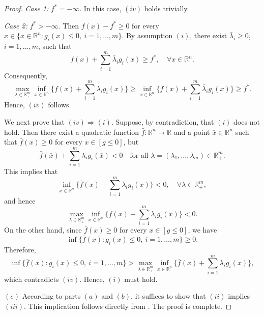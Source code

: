 \documentclass[]{interact}
\theoremstyle{plain}%
\theoremstyle{definition}
\theoremstyle{remark}
\begin{document}
\begin{proof}
		\medskip
		\noindent
		{\it Case 1:} $f^*=-\infty$.  
		In this case, $(iv)$ holds trivially.
		
		\medskip
		\noindent
		{\it Case 2:} $f^*>-\infty$.  
		Then $f(x)-f^*\geq 0$ for every $x\in \{x\in \mathbb{R}^n: g_i(x)\leq 0,\ i=1,\ldots,m\}$. 
		By assumption $(i)$, there exist $\bar\lambda_i\geq 0$, $i=1,\ldots,m$, such that
		\[
		f(x)+\sum_{i=1}^{m}\bar\lambda_ig_i(x)\geq f^*,
		\quad \forall x\in \mathbb{R}^n.
		\]
		Consequently,
		\[
		\max_{\lambda\in  \mathbb{R}^m_+}
		\inf_{x\in \mathbb{R}^n}
		\bigg\{f(x)+\sum_{i=1}^{m}\lambda_ig_i(x)\bigg\}
		\geq
		\inf_{x\in \mathbb{R}^n}
		\bigg\{f(x)+\sum_{i=1}^{m}\bar\lambda_ig_i(x)\bigg\}
		\geq f^*.
		\]
		Hence, $(iv)$ follows.
		
		\medskip
		We next prove that $(iv)\Rightarrow(i)$. 
		Suppose, by contradiction, that $(i)$ does not hold. Then there exist a quadratic function
		$\bar f:\mathbb{R}^n\to \mathbb{R}$ and a point $\bar x\in \mathbb{R}^n$ such that
		$\bar f(x)\geq 0$ for every $x\in [g\leq 0]$, but
		\[
		\bar f(\bar x)+\sum_{i=1}^{m}\lambda_ig_i(\bar x)<0
		\quad \text{for all } \lambda=(\lambda_1,\ldots,\lambda_m)\in \mathbb{R}^m_+.
		\]
		This implies that
		\[
		\inf_{x\in \mathbb{R}^n}
		\bigg\{\bar f(x)+\sum_{i=1}^{m}\lambda_ig_i(x)\bigg\}<0,
		\quad \forall \lambda\in \mathbb{R}^m_+,
		\]
		and hence
		\[
		\max_{\lambda\in  \mathbb{R}^m_+}
		\inf_{x\in \mathbb{R}^n}
		\bigg\{\bar f(x)+\sum_{i=1}^{m}\lambda_ig_i(x)\bigg\}<0.
		\]
		On the other hand, since $\bar f(x)\geq 0$ for every $x\in [g\leq 0]$, we have
		\[
		\inf \bigg\{\bar f(x): g_i(x)\leq 0,\ i=1,\ldots,m\bigg\}\geq 0.
		\]
		Therefore,
		\[
		\inf \bigg\{\bar f(x): g_i(x)\leq 0,\ i=1,\ldots,m\bigg\}
		>
		\max_{\lambda\in  \mathbb{R}^m_+}
		\inf_{x\in \mathbb{R}^n}
		\bigg\{\bar f(x)+\sum_{i=1}^{m}\lambda_ig_i(x)\bigg\},
		\]
		which contradicts $(iv)$. Hence, $(i)$ must hold.
		
		\medskip
		$(e)$ According to parts $(a)$ and $(b)$, it suffices to show that $(ii)$ implies $(iii)$. 
		This implication follows directly from \cite[Theorem~3.1]{JeyakumarHuyLi2009}.
		The proof is complete. 
	\end{proof}
	
\end{document}
